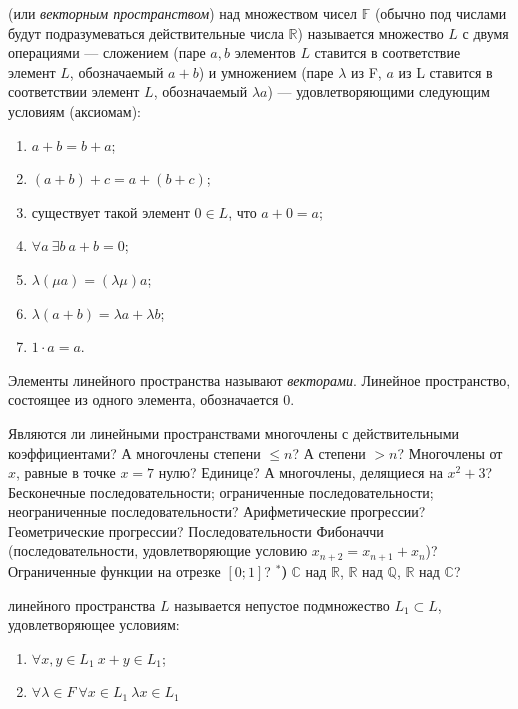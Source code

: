 \documentclass[12pt]{article}
\newcommand{\pstar}[1][]{\refstepcounter{pnum}{\immediate\write\tempfile{\arabic{znum}.\arabic{pnum}.\pstyle.\if\relax\detokenize{#1}\relax\zprev\else#1\fi}} {\bf\thepnum}$^{\mbox{#1}*}${\bf{)}$\;$}}
\begin{document}

{ (или {\it векторным пространством}) над множеством чисел $\mathbb{F}$ (обычно под числами будут подразумеваться действительные числа $\mathbb{R}$) называется множество $L$ с двумя операциями --- сложением (паре $a, b$ элементов $L$ ставится в соответствие элемент $L$, обозначаемый $a+b$) и умножением (паре $\lambda$ из F, $a$ из L ставится в соответствии элемент $L$, обозначаемый $\lambda a$) --- удовлетворяющими следующим условиям (аксиомам):
\begin{enumerate}
	\item $a+b = b+a$;
	\item $(a+b)+c = a+(b+c)$;
	\item существует такой элемент $0\in L$, что $a+0 = a$;
	\item $\forall a \  \exists b \  a+b = 0$;
	\item $\lambda(\mu a) = (\lambda\mu) a$;
	\item $\lambda (a+b) = \lambda a + \lambda b$;
	\item $1\cdot a = a$.
\end{enumerate}
Элементы линейного пространства называют {\it векторами}. Линейное пространство, состоящее из одного элемента, обозначается $0$.
}

\z Являются ли линейными пространствами
	\p многочлены с действительными коэффициентами? А многочлены степени $\le n$? А степени $>n$?
	\p Многочлены от $x$, равные в точке $x=7$ нулю? Единице? А многочлены, делящиеся на $x^2+3$?
	\p Бесконечные последовательности; ограниченные последовательности; неограниченные последовательности?
	\p Арифметические прогрессии? Геометрические прогрессии?
	\p Последовательности Фибоначчи (последовательности, удовлетворяющие условию $x_{n+2} = x_{n+1} + x_n$)?
	\p Ограниченные функции на отрезке $[0;1]$?
	\pstar $\mathbb C$ над $\mathbb R$, $\mathbb R$ над $\mathbb Q$, $\mathbb R$ над $\mathbb C$?
	






{

 линейного пространства $L$
называется непустое подмножество $L_1\subset L$, удовлетворяющее условиям:
\begin{enumerate}
	\item $\forall x,y\in L_1 \ x+y\in L_1$;
	\item $\forall \lambda \in F \  \forall x\in L_1 \  \lambda x\in L_1$
\end{enumerate}
}
\end{document}
